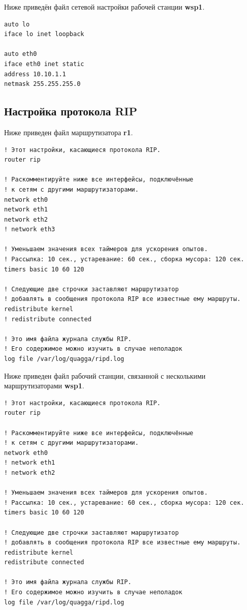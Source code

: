 \documentclass[a4paper,12pt]{article}
\begin{document}
Ниже приведён файл сетевой настройки рабочей станции \textbf{wsp1}.

\begin{Verbatim}
auto lo
iface lo inet loopback

auto eth0
iface eth0 inet static
address 10.10.1.1
netmask 255.255.255.0
\end{Verbatim}


\subsection{Настройка протокола RIP}

Ниже приведен файл  маршрутизатора \textbf{r1}.

\begin{Verbatim}
! Этот настройки, касающиеся протокола RIP.
router rip

! Раскомментируйте ниже все интерфейсы, подключённые
! к сетям с другими маршрутизаторами.
network eth0
network eth1
network eth2
! network eth3

! Уменьшаем значения всех таймеров для ускорения опытов.
! Рассылка: 10 сек., устаревание: 60 cек., сборка мусора: 120 сек.
timers basic 10 60 120

! Следующие две строчки заставляют маршрутизатор
! добавлять в сообщения протокола RIP все известные ему маршруты.
redistribute kernel
! redistribute connected

! Это имя файла журнала службы RIP.
! Его содержимое можно изучить в случае неполадок
log file /var/log/quagga/ripd.log
\end{Verbatim}


Ниже приведен файл  рабочий станции, связанной с несколькими маршрутизаторами \textbf{wsp1}.

\begin{Verbatim}
! Этот настройки, касающиеся протокола RIP.
router rip

! Раскомментируйте ниже все интерфейсы, подключённые
! к сетям с другими маршрутизаторами.
network eth0
! network eth1
! network eth2

! Уменьшаем значения всех таймеров для ускорения опытов.
! Рассылка: 10 сек., устаревание: 60 cек., сборка мусора: 120 сек.
timers basic 10 60 120

! Следующие две строчки заставляют маршрутизатор
! добавлять в сообщения протокола RIP все известные ему маршруты.
redistribute kernel
redistribute connected

! Это имя файла журнала службы RIP.
! Его содержимое можно изучить в случае неполадок
log file /var/log/quagga/ripd.log
\end{Verbatim}
\end{document}
